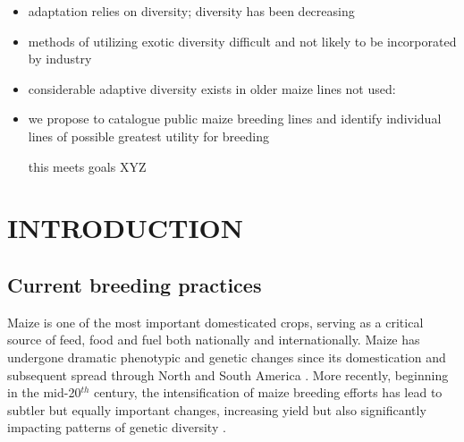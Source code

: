 \documentclass[12pt]{article}
\begin{document}
\begin{itemize}


\item adaptation relies on diversity; diversity has been decreasing

\item methods of utilizing exotic diversity difficult and not likely to be incorporated by industry

\item considerable adaptive diversity exists in older maize lines not used:

\item we propose  to catalogue public maize breeding lines and identify individual lines of possible greatest utility for breeding

this meets goals XYZ

\end{itemize}

\section*{INTRODUCTION}
\label{S:1}
\subsection*{Current breeding practices}
Maize is one of the most important domesticated crops, serving as a critical source of feed, food and fuel both nationally and internationally. 
Maize has undergone dramatic phenotypic and genetic changes since its domestication and subsequent spread through North and South America \citep{daFonseca:2015ey} \citep{Doebley:2004ce}. More recently, beginning in the mid-20$^{th}$ century, the intensification of maize breeding efforts has lead to subtler but equally important changes, increasing yield but also significantly impacting patterns of genetic diversity \citep{Duvick:2001fy} \citep{vanHeerwaarden:2012im}.
\end{document}
